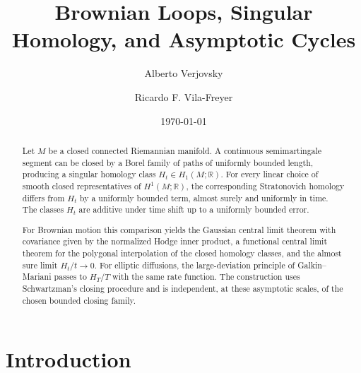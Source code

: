 \documentclass[a4paper,reqno]{amsart}
\newcommand{\R}{\mathbb R}
\theoremstyle{definition}
\begin{document}
\title[Brownian Loops and Asymptotic Cycles]
{Brownian Loops, Singular Homology, and Asymptotic Cycles}

\author[Alberto Verjovsky]{Alberto Verjovsky}
\address{Instituto de Matem\'aticas\\
Universidad Nacional Aut\'onoma de M\'exico\\
Apartado Postal 273, Administraci\'on de Correos \#3\\
C.P. 62251 Cuernavaca, Morelos, M\'exico}

\author[Ricardo F. Vila-Freyer]{Ricardo F. Vila-Freyer}
\address{CIMAT\\
Apdo. Postal 402, Guanajuato, Gto., C.P. 36000, M\'exico}

\date{\today}


\begin{abstract}
Let $M$ be a closed connected Riemannian manifold.  A continuous
semimartingale segment can be closed by a Borel family of paths of uniformly
bounded length, producing a singular homology class
$H_t\in H_1(M;\R)$.  For every linear choice of smooth closed representatives
of $H^1(M;\R)$, the corresponding Stratonovich homology differs from $H_t$ by
a uniformly bounded term, almost surely and uniformly in time.  The classes
$H_t$ are additive under time shift up to a uniformly bounded error.

For Brownian motion this comparison yields the Gaussian central limit theorem
with covariance given by the normalized Hodge inner product, a functional
central limit theorem for the polygonal interpolation of the closed homology
classes, and the almost sure limit $H_t/t\to0$.  For elliptic diffusions, the
large-deviation principle of Galkin--Mariani passes to $H_T/T$ with the same
rate function.  The construction uses Schwartzman's closing procedure and is independent, at these asymptotic scales, of the chosen bounded closing family.
\end{abstract}

\maketitle
\tableofcontents

\section{Introduction}
\end{document}
